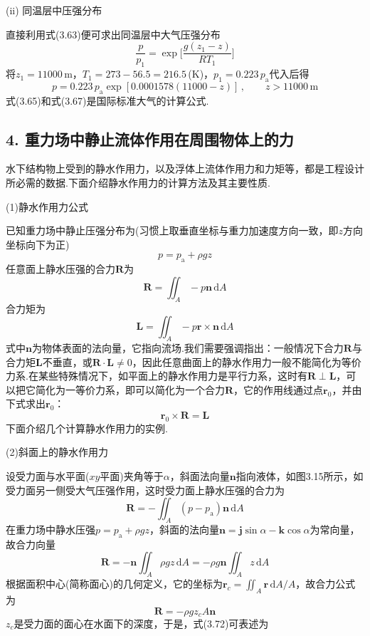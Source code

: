 (ii) 同温层中压强分布

直接利用式(3.63)便可求出同温层中大气压强分布
\[
\frac{p}{p_1}=\exp\bigg[\frac{g(z_1-z)}{RT_1}\bigg]
\]
将$z_1=11000\,$m，$T_1=273-56.5=216.5\,$(K)，$p_1=0.223\,p_{\mathrm{a}}$代入后得
\begin{equation*}
p=0.223\,p_{\mathrm{a}}\exp[0.0001578(11000-z)]\,,\qquad z>11000\,\mathrm{m}
\tag{3.67}
\end{equation*}
式(3.65)和式(3.67)是国际标准大气的计算公式.

\subsection*{4. 重力场中静止流体作用在周围物体上的力}

水下结构物上受到的静水作用力，以及浮体上流体作用力和力矩等，都是工程设计所必需的数据.下面介绍静水作用力的计算方法及其主要性质.

(1)静水作用力公式

已知重力场中静止压强分布为(习惯上取垂直坐标与重力加速度方向一致，即$z$方向坐标向下为正)
\begin{equation*}
p=p_{\mathrm{a}}+\rho g z
\tag{3.68}
\end{equation*}
任意面上静水压强的合力$\boldsymbol{R}$为
\begin{equation*}
\boldsymbol{R}=\iint_A -p\boldsymbol{n}\,\mathrm{d}A
\tag{3.69}
\end{equation*}
合力矩为
\begin{equation*}
\boldsymbol{L}=\iint_A -p\boldsymbol{r}\times\boldsymbol{n}\,\mathrm{d}A
\tag{3.70}
\end{equation*}
式中$\boldsymbol{n}$为物体表面的法向量，它指向流场.我们需要强调指出：一般情况下合力$\boldsymbol{R}$与合力矩$\boldsymbol{L}$不垂直，或$\boldsymbol{R}\cdot\boldsymbol{L}\neq 0$，因此任意曲面上的静水作用力一般不能简化为等价力系.在某些特殊情况下，如平面上的静水作用力是平行力系，这时有$\boldsymbol{R}\perp\boldsymbol{L}$，可以把它简化为一等价力系，即可以简化为一个合力$\boldsymbol{R}$，它的作用线通过点$\boldsymbol{r}_0$，并由下式求出$\boldsymbol{r}_0$：
\begin{equation*}
\boldsymbol{r}_0\times\boldsymbol{R}=\boldsymbol{L}
\tag{3.71}
\end{equation*}
下面介绍几个计算静水作用力的实例.

(2)斜面上的静水作用力

设受力面与水平面($xy$平面)夹角等于$\alpha$，斜面法向量$\boldsymbol{n}$指向液体，如图3.15所示，如受力面另一侧受大气压强作用，这时受力面上静水压强的合力为
\[
\boldsymbol{R}=-\iint_A(p-p_{\mathrm{a}})\boldsymbol{n}\,\mathrm{d}A
\]
在重力场中静水压强$p=p_{\mathrm{a}}+\rho gz$，斜面的法向量$\boldsymbol{n}=\boldsymbol{j}\sin\alpha-\boldsymbol{k}\cos\alpha$为常向量，故合力向量
\[
\boldsymbol{R}=-\boldsymbol{n}\iint_A \rho gz\,\mathrm{d}A=-\rho g\boldsymbol{n}\iint_A z\,\mathrm{d}A
\]
根据面积中心(简称面心)的几何定义，它的坐标为$\boldsymbol{r}_c=\displaystyle\iint_A \boldsymbol{r}\,\mathrm{d}A/A$，故合力公式为
\begin{equation*}
\boldsymbol{R}=-\rho g z_c A\boldsymbol{n}
\tag{3.72}
\end{equation*}
$z_c$是受力面的面心在水面下的深度，于是，式(3.72)可表述为

